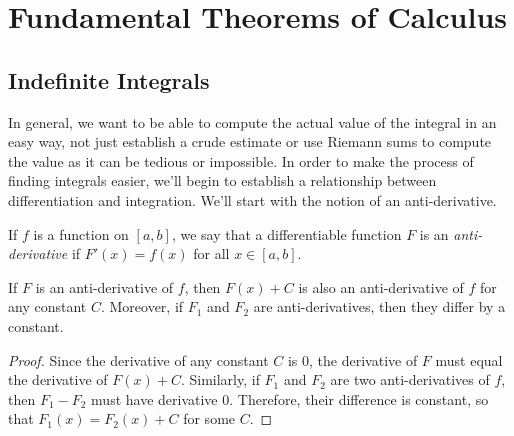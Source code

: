 
\section{Fundamental Theorems of Calculus}











\subsection{Indefinite Integrals}


In general, we want to be able to compute the actual value of the integral in an easy way, not just establish a crude estimate or use Riemann sums to compute the value as it can be tedious or impossible. In order to make the process of finding integrals easier, we'll begin to establish a relationship between differentiation and integration. We'll start with the notion of an anti-derivative.
\begin{defn}
If $f$ is a function on $[a,b]$, we say that a differentiable function $F$ is an \emph{anti-derivative} if $F'(x)=f(x)$ for all $x\in [a,b]$.
\end{defn}
\begin{prop}\label{PlusC}
  If $F$ is an anti-derivative of $f$, then $F(x)+C$ is also an anti-derivative of $f$ for any constant $C$. Moreover, if $F_1$ and $F_2$ are anti-derivatives, then they differ by a constant.
\end{prop}
\begin{proof}
  Since the derivative of any constant $C$ is $0$, the derivative of $F$ must equal the derivative of $F(x)+C$. Similarly, if $F_1$ and $F_2$ are two anti-derivatives of $f$, then $F_1-F_2$ must have derivative 0. Therefore, their difference is constant, so that $F_1(x)=F_2(x)+C$ for some $C$.
\end{proof}


